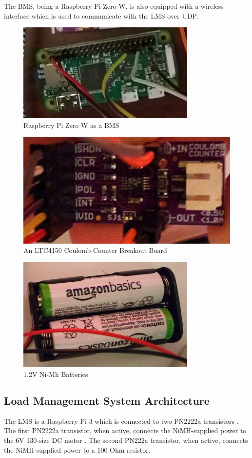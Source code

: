 \documentclass[11pt,conference,draftcls,onecolumn]{IEEEtran}
\begin{document}
The BMS, being a Raspberry Pi Zero W, is also equipped with a wireless interface which is used to communicate with the LMS over UDP.
\begin{figure}[!htbp]
    \centering
    \includegraphics[width=3.5in]{img/rpi0w.png}
    \caption{Raspberry Pi Zero W as a BMS}
    \label{fig:rpi0w}
\end{figure}
\begin{figure}[!htbp]
    \centering
    \includegraphics[width=4.5in]{img/coulombCounter.png}
    \caption{An LTC4150 Coulomb Counter Breakout Board}
    \label{fig:coulombCounter}
\end{figure}
\begin{figure}[!htbp]
    \centering
    \includegraphics[width=3.5in]{img/nimhBatt.png}
    \caption{1.2V Ni-Mh Batteries}
    \label{fig:nimhBatt}
\end{figure}

\subsection{Load Management System Architecture}
The LMS is a Raspberry Pi 3 which is connected to two PN2222a transistors \cite{pn2222a}.
The first PN2222a transistor, when active, connects the NiMH-supplied power to the 6V 130-size DC motor \cite{130motor}.
The second PN222a transistor, when active, connects the NiMH-supplied power to a 100 Ohm resistor.
\end{document}
